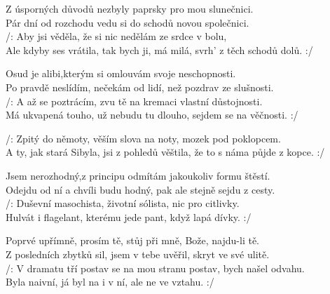 
\ve{}
Z úsporných důvodů nezbyly paprsky pro mou slunečnici.\\
Pár dní od rozchodu vedu si do schodů novou společnici.\\
/: Aby jsi věděla, že si nic nedělám ze srdce v bolu,\\
Ale kdyby ses vrátila, tak bych ji, má milá, svrh' z těch schodů dolů. :/

\ve{}
Osud je alibi,kterým si omlouvám svoje neschopnosti.\\
Po pravdě neslídím, nečekám od lidí, než pozdrav ze slušnosti.\\
/: A až se poztrácím, zvu tě na kremaci vlastní důstojnosti.\\
Má ukvapená touho, už nebudu tu dlouho, sejdem se na věčnosti. :/

\cho{}
/: Zpitý do němoty, věším slova na noty, mozek pod poklopcem.\\
A ty, jak stará Sibyla, jsi z pohledů věštila, že to s náma půjde z kopce. :/

\ve{}
Jsem nerozhodný,z principu odmítám jakoukoliv formu štěstí.\\
Odejdu od ní a chvíli budu hodný, pak ale stejně sejdu z cesty.\\
/: Duševní masochista, životní sólista, nic pro citlivky.\\
Hulvát i flagelant, kterému jede pant, když lapá dívky. :/

\cho{}

\ve{}
Poprvé upřímně, prosím tě, stůj při mně, Bože, najdu-li tě.\\
Z posledních zbytků sil, jsem v tebe uvěřil, skryt ve své ulitě.\\
/: V dramatu tří postav se na mou stranu postav, bych našel odvahu.\\
Byla naivní, já byl na i v ní, ale ne ve vztahu. :/

\cho{}

\esong{}